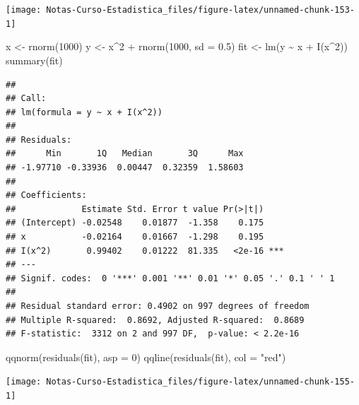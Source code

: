 \documentclass[
  12pt,
]{book}
\newenvironment{Shaded}{\begin{snugshade}}{\end{snugshade}}
\newcommand{\AttributeTok}[1]{\textcolor[rgb]{0.77,0.63,0.00}{#1}}
\newcommand{\DecValTok}[1]{\textcolor[rgb]{0.00,0.00,0.81}{#1}}
\newcommand{\FloatTok}[1]{\textcolor[rgb]{0.00,0.00,0.81}{#1}}
\newcommand{\FunctionTok}[1]{\textcolor[rgb]{0.00,0.00,0.00}{#1}}
\newcommand{\NormalTok}[1]{#1}
\newcommand{\OtherTok}[1]{\textcolor[rgb]{0.56,0.35,0.01}{#1}}
\newcommand{\SpecialCharTok}[1]{\textcolor[rgb]{0.00,0.00,0.00}{#1}}
\newcommand{\StringTok}[1]{\textcolor[rgb]{0.31,0.60,0.02}{#1}}
\theoremstyle{definition}
\theoremstyle{definition}
\theoremstyle{definition}
\theoremstyle{definition}
\theoremstyle{remark}
\begin{document}
\begin{center}\texttt{[image: Notas-Curso-Estadistica\_files/figure-latex/unnamed-chunk-153-1]} \end{center}

\begin{Shaded}
\begin{Highlighting}[]
\NormalTok{x }\OtherTok{\textless{}{-}} \FunctionTok{rnorm}\NormalTok{(}\DecValTok{1000}\NormalTok{)}
\NormalTok{y }\OtherTok{\textless{}{-}}\NormalTok{ x}\SpecialCharTok{\^{}}\DecValTok{2} \SpecialCharTok{+} \FunctionTok{rnorm}\NormalTok{(}\DecValTok{1000}\NormalTok{, }\AttributeTok{sd =} \FloatTok{0.5}\NormalTok{)}
\NormalTok{fit }\OtherTok{\textless{}{-}} \FunctionTok{lm}\NormalTok{(y }\SpecialCharTok{\textasciitilde{}}\NormalTok{ x }\SpecialCharTok{+} \FunctionTok{I}\NormalTok{(x}\SpecialCharTok{\^{}}\DecValTok{2}\NormalTok{))}
\FunctionTok{summary}\NormalTok{(fit)}
\end{Highlighting}
\end{Shaded}

\begin{verbatim}
## 
## Call:
## lm(formula = y ~ x + I(x^2))
## 
## Residuals:
##      Min       1Q   Median       3Q      Max 
## -1.97710 -0.33936  0.00447  0.32359  1.58603 
## 
## Coefficients:
##             Estimate Std. Error t value Pr(>|t|)    
## (Intercept) -0.02548    0.01877  -1.358    0.175    
## x           -0.02164    0.01667  -1.298    0.195    
## I(x^2)       0.99402    0.01222  81.335   <2e-16 ***
## ---
## Signif. codes:  0 '***' 0.001 '**' 0.01 '*' 0.05 '.' 0.1 ' ' 1
## 
## Residual standard error: 0.4902 on 997 degrees of freedom
## Multiple R-squared:  0.8692, Adjusted R-squared:  0.8689 
## F-statistic:  3312 on 2 and 997 DF,  p-value: < 2.2e-16
\end{verbatim}

\begin{Shaded}
\begin{Highlighting}[]
\FunctionTok{qqnorm}\NormalTok{(}\FunctionTok{residuals}\NormalTok{(fit), }\AttributeTok{asp =} \DecValTok{0}\NormalTok{)}
\FunctionTok{qqline}\NormalTok{(}\FunctionTok{residuals}\NormalTok{(fit), }\AttributeTok{col =} \StringTok{"red"}\NormalTok{)}
\end{Highlighting}
\end{Shaded}

\begin{center}\texttt{[image: Notas-Curso-Estadistica\_files/figure-latex/unnamed-chunk-155-1]} \end{center}
\end{document}
